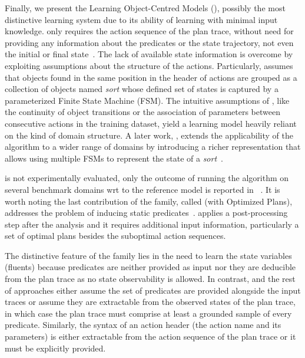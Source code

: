 \vspace{0.15cm}


\textcolor[rgb]{1.00,0.00,0.00}{Finally, we present the Learning Object-Centred Models (\textbf{\LOCM}), possibly the most distinctive learning system due to its ability of learning with minimal input knowledge.} \textbf{\LOCM} only requires the \FO action sequence of the plan trace, without need for providing any information about the predicates or the state trajectory, not even the initial or final state~\cite{CresswellMW09,cresswell2013acquiring}. The lack of available state information is overcome by exploiting assumptions about the structure of the actions. Particularly, \LOCM assumes that objects found in the same position in the header of actions are grouped as a collection of objects \textcolor[rgb]{1.00,0.00,0.00}{named \emph{sort}} whose defined set of states is captured by a parameterized Finite State Machine (FSM). The intuitive assumptions of \LOCM, like the continuity of object transitions or the association of parameters between consecutive actions in the training dataset, yield a learning model heavily reliant on the kind of domain structure. A later work, \textbf{\LOCMtwo}, extends the applicability of the \LOCM algorithm to a wider range of domains by introducing a richer representation that allows using multiple FSMs to represent the state of a \emph{sort}~\cite{cresswell2011generalised}.

\LOCMtwo is not experimentally evaluated, only the outcome of running the \LOCMtwo algorithm on several benchmark domains wrt to the reference model is reported in ~\cite{cresswell2011generalised}. It is worth noting the last contribution of the \LOCM family, called \textbf{\LOP} (\LOCM with Optimized Plans), addresses the problem of inducing static predicates~\cite{GregoryC16}. \LOP applies a post-processing step after the \LOCM analysis and it requires additional input information, particularly a set of optimal plans besides the suboptimal \FO action sequences.

\textcolor[rgb]{1.00,0.00,0.00}{The distinctive feature of the \LOCM family lies in the need to learn the state variables (fluents) because predicates are neither provided as input nor they are deducible from the plan trace as no state observability is allowed. In contrast, \FAMA and the rest of approaches either assume the set of predicates are provided alongside the input traces or assume they are extractable from the observed states of the plan trace, in which case the plan trace must comprise at least a grounded sample of every predicate. Similarly, the syntax of an action header (the action name and its parameters) is either extractable from the action sequence of the plan trace or it must be explicitly provided.}

